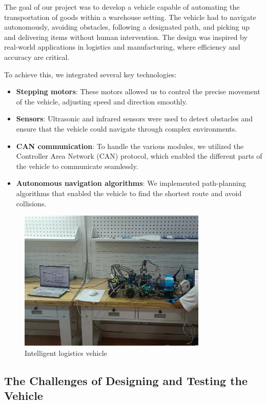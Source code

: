 \documentclass[a4paper]{article} 	%
\begin{document}
The goal of our project was to develop a vehicle capable of automating the transportation of goods within a warehouse setting. The vehicle had to navigate autonomously, avoiding obstacles, following a designated path, and picking up and delivering items without human intervention. The design was inspired by real-world applications in logistics and manufacturing, where efficiency and accuracy are critical.

To achieve this, we integrated several key technologies:
\begin{itemize}
	\item \textbf{Stepping motors}: These motors allowed us to control the precise movement of the vehicle, adjusting speed and direction smoothly.
	\item \textbf{Sensors}: Ultrasonic and infrared sensors were used to detect obstacles and ensure that the vehicle could navigate through complex environments.
	\item \textbf{CAN communication}: To handle the various modules, we utilized the Controller Area Network (CAN) protocol, which enabled the different parts of the vehicle to communicate seamlessly.
	\item \textbf{Autonomous navigation algorithms}: We implemented path-planning algorithms that enabled the vehicle to find the shortest route and avoid collisions.
\end{itemize}

\begin{figure}[h!]
	\centering
	\includegraphics[width=0.8\textwidth]{fig005.jpg}  %
	\caption{Intelligent logistics vehicle}
	\label{fig:005}
\end{figure}

\subsection*{The Challenges of Designing and Testing the Vehicle}
\end{document}
